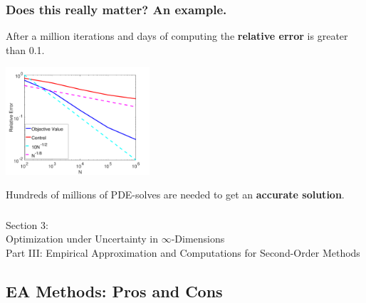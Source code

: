 \documentclass[aspectratio=169,xcolor=dvipsnames,10pt]{beamer}
\begin{document}
\begin{frame}\frametitle{Does this really matter? An example.}
\begin{exampleblock}{}\centering
After a \alert{million} iterations and \alert{days of computing} the \textbf{relative error} is \alert{greater than 0.1}.
\end{exampleblock}
\begin{center}
\includegraphics[width=0.4\textwidth,keepaspectratio]{Part I/figures/error.pdf}
\end{center}
\begin{exampleblock}{}\centering
\alert{Hundreds of millions} of \alert{PDE-solves} are needed to get an \textbf{accurate solution}.
\end{exampleblock}
\end{frame}



\begin{frame}\frametitle{}
\begin{center}\Large
Section 3: \\
Optimization under Uncertainty in $\infty$-Dimensions \\
Part III: Empirical Approximation and Computations for Second-Order Methods
\end{center}
\end{frame}


\subsection{EA Methods: Pros and Cons} 
\end{document}
